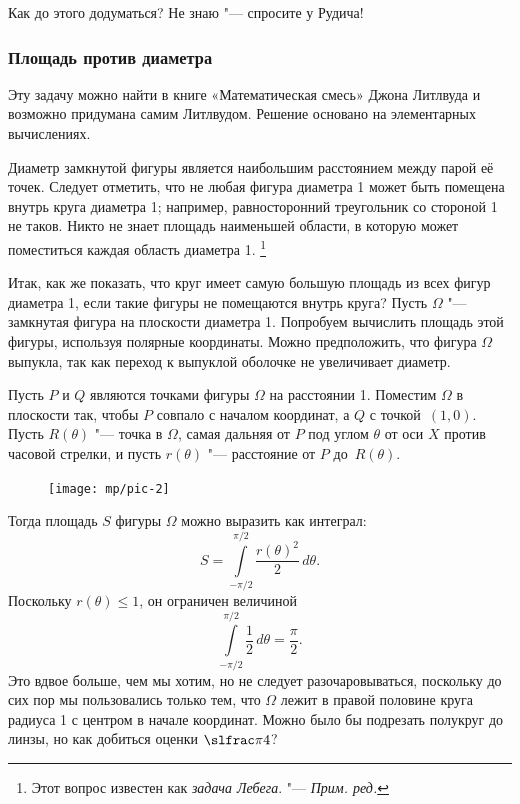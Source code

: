 \documentclass[twoside]{book}
\begin{document}
Как до этого додуматься?
Не  знаю "--- спросите у Рудича!

\subsubsection*{Площадь против диаметра}

Эту задачу можно найти в книге «Математическая смесь» Джона Литлвуда и возможно придумана самим Литлвудом.
Решение основано на элементарных вычислениях.

\medskip

Диаметр замкнутой фигуры является наибольшим расстоянием между парой её точек.
Следует отметить, что не любая фигура диаметра 1 может быть помещена внутрь круга диаметра 1;
например, равносторонний треугольник со стороной 1 не таков.
Никто не знает площадь наименьшей области, в которую может поместиться каждая область диаметра 1.%
\footnote{Этот вопрос известен как \emph{задача Лебега}. "--- \emph{Прим. ред.}}

Итак, как же показать, что круг имеет самую большую площадь из всех фигур диаметра 1, если такие фигуры не помещаются внутрь круга?
Пусть $\Omega$ "--- замкнутая фигура на плоскости диаметра 1.
Попробуем вычислить площадь этой фигуры, используя полярные координаты.
Можно предположить, что фигура $\Omega$ выпукла, так как переход к выпуклой оболочке не увеличивает диаметр.

Пусть $P$ и $Q$ являются точками фигуры $\Omega$ на расстоянии 1.
Поместим $\Omega$ в плоскости так, чтобы $P$ совпало с началом координат, а $Q$ с точкой~$(1,0)$.
Пусть $R(\theta)$ "--- точка в $\Omega$, самая дальняя от $P$ под углом $\theta$ от оси $X$ против часовой стрелки, и пусть $r(\theta)$ "--- расстояние от $P$ до~$R(\theta)$.


\begin{figure}
\vskip4mm
\centering
\texttt{[image: mp/pic-2]}
\end{figure}

Тогда площадь $S$ фигуры $\Omega$ можно выразить как интеграл:
\[S=\int\limits_{-\pi/2}^{\pi/2}\frac{r(\theta)^2}{2}\,d\theta.\]
Поскольку $r(\theta) \le 1$, он ограничен величиной
\[\int\limits_{-\pi/2}^{\pi/2}\frac{1}{2}\,d\theta=\frac\pi2.\]
Это вдвое больше, чем мы хотим, но не следует разочаровываться, поскольку до сих пор мы пользовались только тем, что $\Omega$ лежит в правой половине круга радиуса 1 с центром в начале координат.
Можно было бы подрезать полукруг до линзы, но как добиться оценки $\slfrac\pi4$?
\end{document}
